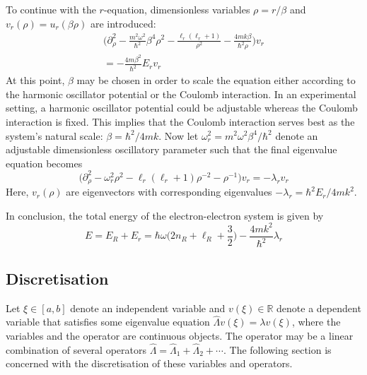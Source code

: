 \documentclass[reprint,english]{revtex4-1}
\begin{document}
To continue with the \(r\)-equation, dimensionless variables \(\rho=r/\beta\) and \(v_r(\rho)=u_r(\beta\rho)\) are introduced:
\begin{align*}
\bigg(\partial_\rho^2-\frac{m^2\omega^2}{\hbar^2}\beta^4\rho^2-\frac{\ell_r(\ell_r+1)}{\rho^2}-\frac{4mk\beta}{\hbar^2\rho}\bigg)v_r\\=-\frac{4m\beta^2}{\hbar^2}E_rv_r
\end{align*}
At this point, \(\beta\) may be chosen in order to scale the equation either according to the harmonic oscillator potential or the Coulomb interaction. In an experimental setting, a harmonic oscillator potential could be adjustable whereas the Coulomb interaction is fixed. This implies that the Coulomb interaction serves best as the system's natural scale: \(\beta=\hbar^2/4mk\). Now let \(\omega_r^2=m^2\omega^2\beta^4/\hbar^2\) denote an adjustable dimensionless oscillatory parameter such that the final eigenvalue equation becomes
\begin{equation}\label{eq:dimless_two_particle_interaction}
\Big(\partial_\rho^2-\omega_r^2\rho^2-\ell_r(\ell_r+1)\rho^{-2}-\rho^{-1}\Big)v_r=-\lambda_rv_r
\end{equation}
Here, \(v_r(\rho)\) are eigenvectors with corresponding eigenvalues \(-\lambda_r=\hbar^2E_r/4mk^2\).

In conclusion, the total energy of the electron-electron system is given by
\begin{equation}
E=E_R+E_r=\hbar\omega\bigg(2n_R+\ell_R+\frac{3}{2}\bigg)-\frac{4mk^2}{\hbar^2}\lambda_r
\end{equation}

\subsection{Discretisation}\label{sec:discretisation}
Let \(\xi\in[a,b]\) denote an independent variable and \(v(\xi)\in\mathbb{R}\) denote a dependent variable that satisfies some eigenvalue equation \(\hat{\Lambda} v(\xi)=\lambda v(\xi)\), where the variables and the operator are continuous objects. The operator may be a linear combination of several operators \(\hat{\Lambda}=\hat{\Lambda}_1+\hat{\Lambda}_2+\cdots\). The following section is concerned with the discretisation of these variables and operators.
\end{document}
